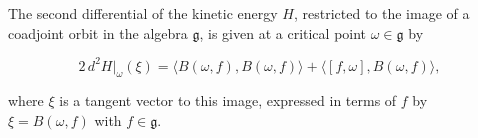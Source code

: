 The second differential of the kinetic energy $H$, restricted to the image of a coadjoint orbit in the algebra $\mathfrak{g}$, is given at a critical point $\omega \in \mathfrak{g}$ by

$$2\,d^2 H|_{\omega}(\xi) = \langle B(\omega, f), B(\omega, f) \rangle + \langle [f, \omega], B(\omega, f) \rangle,$$

where $\xi$ is a tangent vector to this image, expressed in terms of $f$ by $\xi = B(\omega, f)$ with $f \in \mathfrak{g}$.
